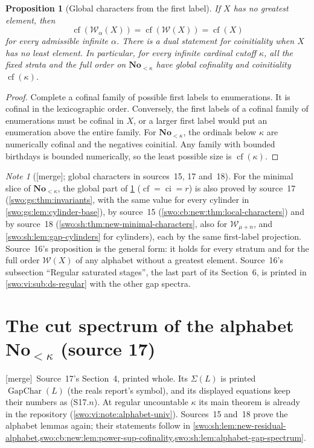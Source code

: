 \documentclass[11pt]{article}
\newtheorem{proposition}[proposition]{Proposition}
\theoremstyle{definition}
\theoremstyle{remark}
\newtheorem{note}[note]{Note}
\newcommand{\No}{\mathbf{No}}
\newcommand{\WO}{\mathcal W}
\newcommand{\cf}{\operatorname{cf}}
\newcommand{\merge}{\textsf{[merge]}}
\newcommand{\ci}{\operatorname{ci}}
\newcommand{\GapChar}{\operatorname{GapChar}}
\begin{document}
\begin{proposition}[Global characters from the first label]\label{swo:ds:prop:globalcf}
If $X$ has no greatest element, then
\[
 \cf(\WO_\alpha(X))=\cf(\WO(X))=\cf(X)
\]
for every admissible infinite $\alpha$. There is a dual statement for
coinitiality when $X$ has no least element. In particular, for every
infinite cardinal cutoff $\kappa$, all the fixed strata and the full
order on $\No_{<\kappa}$ have global cofinality and coinitiality $\cf(\kappa)$.
\end{proposition}
\begin{proof}
Complete a cofinal family of possible first labels to enumerations. It is
cofinal in the lexicographic order. Conversely, the first labels of a
cofinal family of enumerations must be cofinal in $X$, or a larger first
label would put an enumeration above the entire family. For $\No_{<\kappa}$,
the ordinals below $\kappa$ are numerically cofinal and the negatives
coinitial. Any family with bounded birthdays is bounded numerically, so
the least possible size is $\cf(\kappa)$.
\end{proof}

\begin{note}[\merge; global characters in sources~15, 17 and~18]\label{swo:vi:note:globalcf}
For the minimal slice of $\No_{<\kappa}$, the global part of
\cref{swo:ds:prop:globalcf} ($\cf=\ci=r$) is also proved by source~17
(\cref{swo:gs:thm:invariants}, with the same value for every cylinder in
\cref{swo:gs:lem:cylinder-base}), by source~15 (\cref{swo:cb:new:thm:local-characters})
and by source~18 (\cref{swo:sh:thm:new-minimal-characters}, also for
$\WO_{\mu+n}$, and \cref{swo:sh:lem:gap-cylinders} for cylinders), each by the
same first-label projection. Source~16's proposition is the general form: it
holds for every stratum and for the full order $\WO(X)$ of any alphabet
without a greatest element. Source~16's subsection ``Regular saturated
stages'', the last part of its Section~6, is printed in
\cref{swo:vi:sub:ds-regular} with the other gap spectra.
\end{note}

\section{The cut spectrum of the alphabet \texorpdfstring{$\No_{<\kappa}$}{No<kappa} (source 17)}
\label{swo:gs:sec:alphabet}

\merge\ Source~17's Section~4, printed whole. Its $\Sigma(L)$ is printed
$\GapChar(L)$ (the reals report's symbol), and its displayed equations keep
their numbers as (S17.$n$). At regular uncountable $\kappa$ its main theorem
is already in the repository (\cref{swo:vi:note:alphabet-univ}). Sources~15
and~18 prove the alphabet lemmas again; their statements follow in
\cref{swo:sh:lem:new-residual-alphabet,swo:cb:new:lem:power-sup-cofinality,swo:sh:lem:alphabet-gap-spectrum}.
\end{document}
